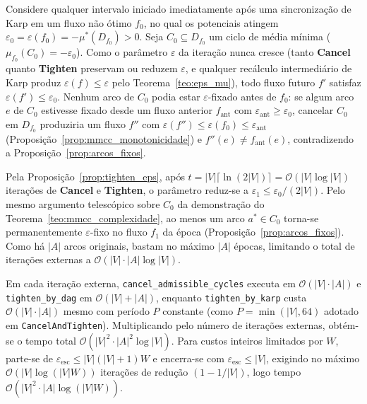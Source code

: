 \begin{demonstracao}
Considere qualquer intervalo iniciado imediatamente após uma sincronização de Karp em um fluxo não ótimo $f_0$, no qual os potenciais atingem $\varepsilon_0 = \varepsilon(f_0) = -\mu^*(D_{f_0}) > 0$. Seja $C_0 \subseteq D_{f_0}$ um ciclo de média mínima ($\mu_{f_0}(C_0) = -\varepsilon_0$). Como o parâmetro $\varepsilon$ da iteração nunca cresce (tanto \textbf{Cancel} quanto \textbf{Tighten} preservam ou reduzem $\varepsilon$, e qualquer recálculo intermediário de Karp produz $\varepsilon(f) \le \varepsilon$ pelo Teorema~\ref{teo:eps_mu}), todo fluxo futuro $f'$ satisfaz $\varepsilon(f') \le \varepsilon_0$. Nenhum arco de $C_0$ podia estar $\varepsilon$-fixado antes de $f_0$: se algum arco $e$ de $C_0$ estivesse fixado desde um fluxo anterior $f_{\text{ant}}$ com $\varepsilon_{\text{ant}} \ge \varepsilon_0$, cancelar $C_0$ em $D_{f_0}$ produziria um fluxo $f''$ com $\varepsilon(f'') \le \varepsilon(f_0) \le \varepsilon_{\text{ant}}$ (Proposição~\ref{prop:mmcc_monotonicidade}) e $f''(e) \neq f_{\text{ant}}(e)$, contradizendo a Proposição~\ref{prop:arcos_fixos}.

Pela Proposição~\ref{prop:tighten_eps}, após $t = |V|\lceil \ln(2|V|) \rceil = \mathcal{O}(|V| \log |V|)$ iterações de \textbf{Cancel} e \textbf{Tighten}, o parâmetro reduz-se a $\varepsilon_1 \le \varepsilon_0 / (2|V|)$. Pelo mesmo argumento telescópico sobre $C_0$ da demonstração do Teorema~\ref{teo:mmcc_complexidade}, ao menos um arco $a^* \in C_0$ torna-se permanentemente $\varepsilon$-fixo no fluxo $f_1$ da época (Proposição~\ref{prop:arcos_fixos}). Como há $|A|$ arcos originais, bastam no máximo $|A|$ épocas, limitando o total de iterações externas a $\mathcal{O}(|V| \cdot |A| \log |V|)$.

Em cada iteração externa, \lstinline{cancel_admissible_cycles} executa em $\mathcal{O}(|V| \cdot |A|)$ e \lstinline{tighten_by_dag} em $\mathcal{O}(|V| + |A|)$, enquanto \lstinline{tighten_by_karp} custa $\mathcal{O}(|V| \cdot |A|)$ mesmo com período $P$ constante (como $P = \min(|V|, 64)$ adotado em \lstinline{CancelAndTighten}). Multiplicando pelo número de iterações externas, obtém-se o tempo total $\mathcal{O}(|V|^2 \cdot |A|^2 \log |V|)$. Para custos inteiros limitados por $W$, parte-se de $\varepsilon_{\text{esc}} \le |V|(|V|+1)W$ e encerra-se com $\varepsilon_{\text{esc}} \le |V|$, exigindo no máximo $\mathcal{O}(|V|\log(|V|W))$ iterações de redução $(1 - 1/|V|)$, logo tempo $\mathcal{O}(|V|^2 \cdot |A| \log(|V|W))$.
\end{demonstracao}

